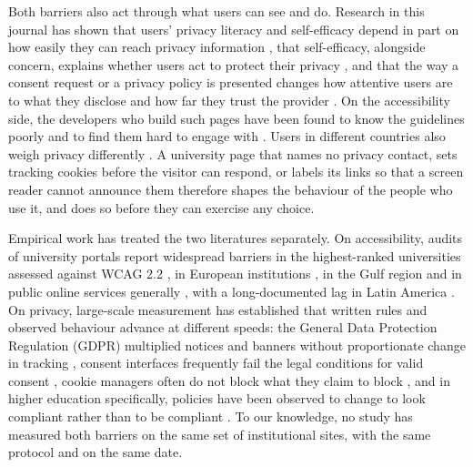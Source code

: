 \documentclass[]{interact}
\begin{document}
Both barriers also act through what users can see and do. Research in this journal has shown that users' privacy literacy and self-efficacy depend in part on how easily they can reach privacy information \citep{meier2025differences}, that self-efficacy, alongside concern, explains whether users act to protect their privacy \citep{epstein2025dimensionalised}, and that the way a consent request or a privacy policy is presented changes how attentive users are to what they disclose and how far they trust the provider \citep{lindegren2021evaluation,magrizos2026transparency}. On the accessibility side, the developers who build such pages have been found to know the guidelines poorly and to find them hard to engage with \citep{cao2022perceptions,spyridonis2021serious}. Users in different countries also weigh privacy differently \citep{li2022cultural}. A university page that names no privacy contact, sets tracking cookies before the visitor can respond, or labels its links so that a screen reader cannot announce them therefore shapes the behaviour of the people who use it, and does so before they can exercise any choice.

Empirical work has treated the two literatures separately. On accessibility, audits of university portals report widespread barriers in the highest-ranked universities assessed against WCAG 2.2 \citep{krittika2025accessibility}, in European institutions \citep{krejtz2025higher}, in the Gulf region \citep{fakrudeen2025evaluation} and in public online services generally \citep{aljedaani2025egovernment,iniesto2025service}, with a long-documented lag in Latin America \citep{campoverdemolina2023accessibility,acostavargas2020dataset}. On privacy, large-scale measurement has established that written rules and observed behaviour advance at different speeds: the General Data Protection Regulation (GDPR) \citep{gdpr2016} multiplied notices and banners without proportionate change in tracking \citep{degeling2019value,trevisan2019four,kretschmer2021cookie}, consent interfaces frequently fail the legal conditions for valid consent \citep{matte2020cookie,nouwens2020dark,gray2021dark,habib2022okay}, cookie managers often do not block what they claim to block \citep{sanchezrola2019can,bollinger2022automating}, and in higher education specifically, policies have been observed to change to look compliant rather than to be compliant \citep{munot2025compliance}. To our knowledge, no study has measured both barriers on the same set of institutional sites, with the same protocol and on the same date.
\end{document}
